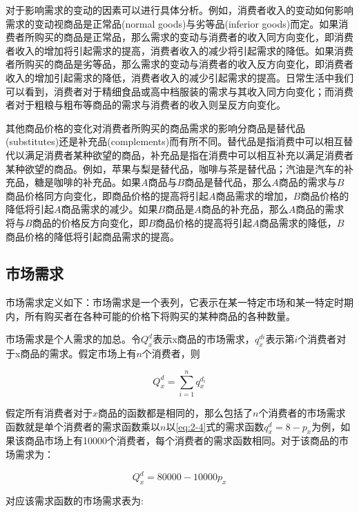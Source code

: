 对于影响需求的变动的因素可以进行具体分析。例如，消费者收入的变动如何影响需求的变动视商品是{\hei 正常品}(normal goods)与{\hei 劣等品}(inferior goods)而定。如果消费者所购买的商品是{\hei 正常品}，那么需求的变动与消费者的收入同方向变化，即消费者收入的增加将引起需求的提高，消费者收入的减少将引起需求的降低。如果消费者所购买的商品是{\hei 劣等品}，那么需求的变动与消费者的收入反方向变化，即消费者收入的增加引起需求的降低，消费者收入的减少引起需求的提高。日常生活中我们可以看到，消费者对于精细食品或高中档服装的需求与其收入同方向变化；而消费者对于粗粮与粗布等商品的需求与消费者的收入则呈反方向变化。

其他商品价格的变化对消费者所购买的商品需求的影响分商品是{\hei 替代品}(substitutes)还是{\hei 补充品}(complements)而有所不同。{\hei 替代品}是指消费中可以相互替代以满足消费者某种欲望的商品，{\hei 补充品}是指在消费中可以相互补充以满足消费者某种欲望的商品。例如，苹果与梨是替代品，咖啡与茶是替代品；汽油是汽车的补充品，糖是咖啡的补充品。如果$A$商品与$B$商品是替代品，那么$A$商品的需求与$B$商品价格同方向变化，即商品价格的提高将引起$A$商品需求的增加，$B$商品价格的降低将引起$A$商品需求的减少。如果$B$商品是$A$商品的补充品，那么$A$商品的需求将与$B$商品的价格反方向变化，即$B$商品价格的提高将引起$A$商品需求的降低，$B$商品价格的降低将引起商品需求的提高。

\subsection{市场需求}

市场需求定义如下：{\hei 市场需求}是一个表列，它表示在某一特定市场和某一特定时期内，所有购买者在各种可能的价格下将购买的某种商品的各种数量。

市场需求是个人需求的加总。令$Q_x^d$表示x商品的市场需求，$q_x^{di}$表示第$i$个消费者对于x商品的需求。假定市场上有$n$个消费者，则

\begin{equation}\label{eq:2-5}
	Q_x^d = \sum_{i=1}^nq_x^{d_i}	
\end{equation}

假定所有消费者对于$x$商品的函数都是相同的，那么包括了$n$个消费者的市场需求函数就是单个消费者的需求函数乘以$n$以\eqref{eq:2-4}式的需求函数$q_x^d=8-p_x$为例，如果该商品市场上有10000个消费者，每个消费者的需求函数相同。对于该商品的市场需求为：

\begin{equation}\label{eq:2-6}
	Q_x^d = 80000 - 10000p_x
\end{equation}


对应该需求函数的市场需求表为:

